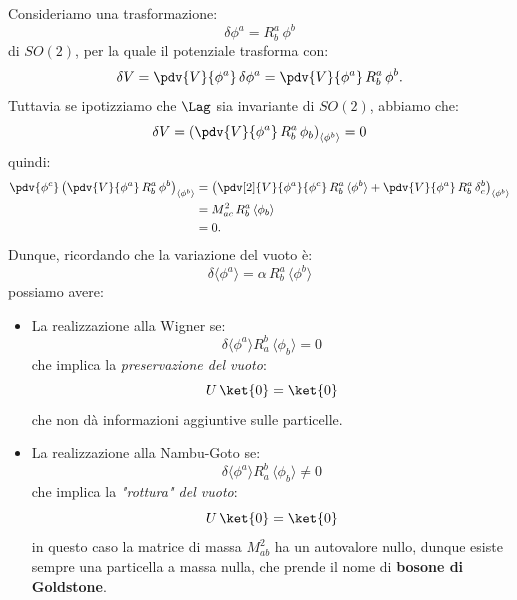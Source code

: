 Consideriamo una trasformazione:
\begin{equation}
    \delta\phi^a = R^a_b\, \phi^b
\end{equation}
di $SO(2)$, per la quale il potenziale trasforma con:
\begin{equation}
    \delta V = \pdv{V}{\phi^a}\, \delta\phi^a = \pdv{V}{\phi^a}\, R^a_b\, \phi^b.
\end{equation}
Tuttavia se ipotizziamo che $\Lag$ sia invariante di $SO(2)$, abbiamo che:
\begin{equation}
    \delta V = \left(\pdv{V}{\phi^a}\, R^a_b\, \phi_b\right)_{\langle\phi^b\rangle} = 0
\end{equation}
quindi:
\begin{align}
    \pdv{\phi^c}\left( \pdv{V}{\phi^a}\, R_b^a\, \phi^b \right)_{\langle\phi^b\rangle} &= \left( \pdv[2]{V}{\phi^a}{\phi^c}\, R_b^a\, \langle\phi^b\rangle + \pdv{V}{\phi^a}\, R_b^a\, \delta_c^b \right)_{\langle\phi^b\rangle} \\
    &= M_{ac}^2\, R^a_b\, \langle\phi_b\rangle \\
    &= 0.
\end{align}
Dunque, ricordando che la variazione del vuoto è:
\begin{equation}
    \delta\langle\phi^a\rangle = \alpha\, R_b^a\, \langle\phi^b\rangle
\end{equation}
possiamo avere:
\begin{itemize}
    \item La realizzazione alla Wigner se:
    \begin{equation}
        \delta\langle\phi^a\rangle R_a^b\, \langle\phi_b\rangle = 0
    \end{equation}
    che implica la \textit{preservazione del vuoto}:
    \begin{equation}
        U\, \ket{0} = \ket{0}
    \end{equation}
    che non dà informazioni aggiuntive sulle particelle.
    \item La realizzazione alla Nambu-Goto se:
    \begin{equation}
        \delta\langle\phi^a\rangle R_a^b\, \langle\phi_b\rangle \neq 0
    \end{equation}
    che implica la \textit{"rottura" del vuoto}:
    \begin{equation}
        U\, \ket{0} = \ket{0}
    \end{equation}
    in questo caso la matrice di massa $M^2_{ab}$ ha un autovalore nullo, dunque esiste sempre una particella a massa nulla, che prende il nome di \textbf{bosone di Goldstone}.
\end{itemize}


